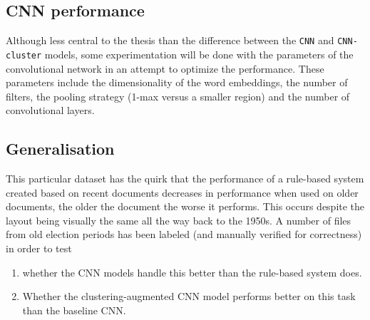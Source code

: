 \subsection{CNN performance}
Although less central to the thesis than the difference between the \texttt{CNN}
and \texttt{CNN-cluster} models, some experimentation will be done with the
parameters of the convolutional network in an attempt to optimize the
performance. These parameters include the dimensionality of the word embeddings,
the number of filters, the pooling strategy (1-max versus a smaller region) and
the number of convolutional layers.

\subsection{Generalisation}
This particular dataset has the quirk that the performance of a rule-based
system created based on recent documents decreases in performance when used on
older documents, the older the document the worse it performs. This occurs
despite the layout being visually the same all the way back to the 1950s. A
number of files from old election periods has been labeled (and manually
verified for correctness) in order to test
\begin{enumerate}
\item whether the CNN models handle this better than the rule-based system does.
\item Whether the clustering-augmented CNN model performs better on this task
  than the baseline CNN.
\end{enumerate}

